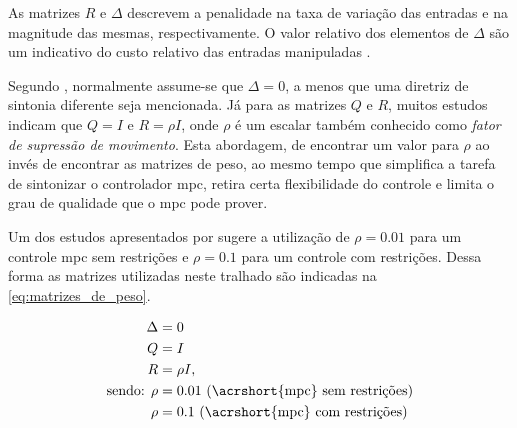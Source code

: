 As matrizes $R$ e $\Delta$ descrevem a penalidade na taxa de variação das entradas e na magnitude das mesmas, 
respectivamente. O valor relativo dos elementos de $\Delta$ são um indicativo do custo relativo das 
entradas manipuladas \cite{Alhajeri2020}.

Segundo , normalmente assume-se que $\Delta = 0$, a menos que uma diretriz de 
sintonia diferente seja mencionada. Já para as matrizes $Q$ e $R$, muitos estudos indicam que
$Q = I$ e $R = \rho I$, onde $\rho$ é um escalar também conhecido como \textit{fator de supressão de movimento}.
Esta abordagem, de encontrar um valor para $\rho$ ao invés de encontrar as matrizes de peso, ao mesmo tempo que
simplifica a tarefa de sintonizar o controlador \acrshort{mpc}, retira certa flexibilidade do controle e
limita o grau de qualidade que o \acrshort{mpc} pode prover.

Um dos estudos apresentados por  sugere a utilização de $\rho = 0.01$ para um controle
\acrshort{mpc} sem restrições e $\rho = 0.1$ para um controle com restrições. Dessa forma as matrizes utilizadas
neste tralhado são indicadas na \cref{eq:matrizes_de_peso}.

\begin{equation}
	\label{eq:matrizes_de_peso}
	\begin{aligned}
		\Delta &= 0																\\
		Q &= I																	\\
		R &= \rho I,															\\
		\text{sendo: } \rho &= 0.01 \text{ (\acrshort{mpc} sem restrições)}		\\
		\rho &= 0.1 \text{ (\acrshort{mpc} com restrições)}
	\end{aligned}
\end{equation}
